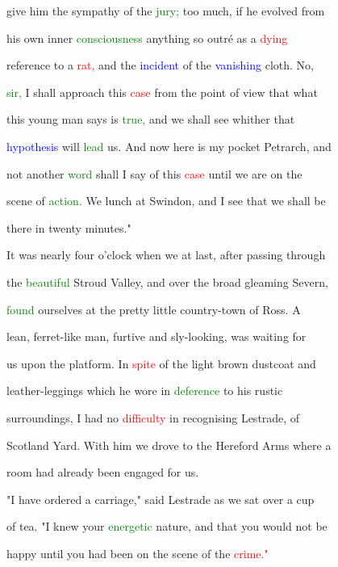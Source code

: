  give him the \textcolor{BurntOrange}{sympathy} of the \textcolor{green}{jury;} too much, if he evolved from

 his own inner \textcolor{green}{consciousness} anything so outré as a \textcolor{red}{dying}

 reference to a \textcolor{red}{rat,} and the \textcolor{blue}{incident} of the \textcolor{blue}{vanishing} cloth. No,

 \textcolor{green}{sir,} I shall approach this \textcolor{red}{case} from the point of view that what

 this \textcolor{BurntOrange}{young} man says is \textcolor{green}{true,} and we shall see whither that

 \textcolor{blue}{hypothesis} will \textcolor{green}{lead} us. And now here is my pocket Petrarch, and

 not another \textcolor{green}{word} shall I say of this \textcolor{red}{case} until we are on the

 scene of \textcolor{green}{action.} We lunch at Swindon, and I see that we shall be

 there in twenty minutes."



 It was nearly four o'clock when we at last, after passing through

 the \textcolor{green}{beautiful} Stroud Valley, and over the broad gleaming Severn,

 \textcolor{green}{found} ourselves at the \textcolor{BurntOrange}{pretty} little country-town of Ross. A

 lean, ferret-like man, furtive and sly-looking, was \textcolor{BurntOrange}{waiting} for

 us upon the platform. In \textcolor{red}{spite} of the light brown dustcoat and

 leather-leggings which he wore in \textcolor{green}{deference} to his rustic

 surroundings, I had no \textcolor{red}{difficulty} in recognising Lestrade, of

 Scotland Yard. With him we drove to the Hereford Arms where a

 room had already been engaged for us.



 "I have ordered a carriage," said Lestrade as we sat over a cup

 of tea. "I knew your \textcolor{green}{energetic} nature, and that you would not be

 \textcolor{BurntOrange}{happy} until you had been on the scene of the \textcolor{red}{crime."}



